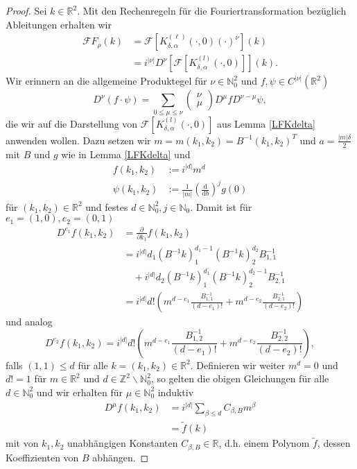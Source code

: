 \documentclass[12pt,a4paper]{scrartcl}
\newcommand{\dd}{\mathrm{d}}
\numberwithin{equation}{section}
\newcommand{\R}{\mathbb{R}} %
\newcommand{\Z}{\mathbb{Z}} %
\newcommand{\N}{\mathbb{N}} %
\newcommand{\F}{\mathcal{F}} %
\begin{document}
\begin{proof}
Sei $k \in \R^2$.
Mit den Rechenregeln für die Fouriertransformation bezüglich Ableitungen erhalten wir
\begin{align*}
\F F_\rho(k) 
&= \F \left[K_{\delta,\alpha}^{(\ell)}(\cdot,0)(\cdot)^\nu \right](k) \\
&=i^{|\nu|} D^\nu \left[ \F[ K_{\delta,\alpha}^{(l)}(\cdot,0)] \right](k).
\end{align*}
Wir erinnern an die allgemeine Produktegel für $\nu \in \N_0^2$ und $f,\psi \in C^{|\nu|}(\R^2)$ 
\[
D^\nu (f \cdot \psi) = \sum_{0 \leq \mu \leq \nu} \begin{pmatrix}
\nu \\ \mu 
\end{pmatrix} D^\mu f D^{\nu-\mu} \psi,
\] die wir auf die Darstellung von $\F[ K_{\delta,\alpha}^{(l)}(\cdot,0)]$ aus Lemma \ref{LFKdelta} anwenden wollen.
Dazu setzen wir $m=m(k_1,k_2)=B^{-1}(k_1,k_2)^T$ und $a=\frac{|m|\delta}{2}$ mit $B$ und $g$ wie in Lemma \ref{LFKdelta} und 
\begin{align*}
f(k_1,k_2) &:= i^{|d|}m^d \\
\psi(k_1,k_2)&:=\frac{1}{|m|}\left(\frac{\dd}{\dd b} \right)^j g(0)
\end{align*}
für $(k_1,k_2)\in \R^2$ und festes $d\in \N_0^2, j \in \N_0$. 
Damit ist für $e_1=(1,0),e_2=(0,1)$
\begin{align*}
D^{e_1} f(k_1,k_2) &= 
\frac{\partial}{\partial k_1}f(k_1,k_2) \\ 
&=
i^{|d|}d_1(B^{-1} k)_1^{d_1-1} (B^{-1} k)_2^{d_2} B^{-1}_{1,1} \\
& \quad + i^{|d|}d_2(B^{-1} k)_1^{d_1} (B^{-1} k)_2^{d_2-1} B^{-1}_{2,1} \\
&=i^{|d|}d!\left( m^{d-e_1} \frac{B_{1,1}^{-1}}{(d-e_1)!} + m^{d-e_2} \frac{B_{2,1}^{-1}}{(d-e_2)!} \right)
\end{align*}
und analog 
\[
D^{e_2} f(k_1,k_2) = i^{|d|}d!\left( m^{d-e_1} \frac{B_{1,2}^{-1}}{(d-e_1)!} + m^{d-e_2} \frac{B_{2,2}^{-1}}{(d-e_2)!} \right),
\]
falls $(1,1) \leq d$ für alle $k=(k_1,k_2) \in \R^2$. Definieren wir weiter $m^d=0$ und $d!=1$ für $m\in \R^2$ und $d \in \Z^2 \backslash \N_0^2$, so gelten die obigen Gleichungen für alle $d \in \N_0^2$ und wir erhalten für $\mu \in \N_0^2$ induktiv
\begin{align*}
 D^\mu f (k_1,k_2) &=i^{|d|} \sum_{\beta\leq d} C_{\beta,B} m^\beta \\
 &= \tilde f(k)
\end{align*}
mit von $k_1,k_2$ unabhängigen Konstanten $C_{\beta,B} \in \R$, d.h. einem Polynom $\tilde f$, dessen Koeffizienten von $B$ abhängen. 


\end{proof}
\end{document}
